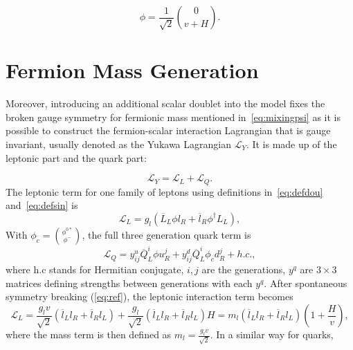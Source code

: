 \begin{equation}
\phi=\frac{1}{\sqrt{2}}\binom{0}{v+H}.
\label{eq:ref}
\end{equation}


\section{Fermion Mass Generation}
\label{mass}
Moreover, introducing an additional scalar doublet into the model fixes the broken gauge symmetry for fermionic mass mentioned in~\autoref{eq:mixingpsi} as it is possible to construct the fermion-scalar interaction Lagrangian that is gauge invariant, usually denoted as the Yukawa Lagrangian $\mathcal{L}_{Y}$. It is made up of the leptonic part and the quark part:

\begin{equation}
	\mathcal{L}_{Y}= \mathcal{L}_{L} + \mathcal{L}_{Q}.
\end{equation}
The leptonic term for one family of leptons using definitions in~\autoref{eq:defdou} and~\autoref{eq:defsin} is
\begin{equation}
	\mathcal{L}_{L}= g_{l}(\overline{L}_{L}\phi l_{R} + \overline{l}_{R} \phi^{\dagger} L_{L}), 
	\label{eq:SSB1}
\end{equation}
With $\phi_{c}=\binom{\phi^{0*}}{\phi^{-}}$, the full three generation quark term is
\begin{equation}
	\mathcal{L}_{Q}= y^{u}_{ij}\overline{Q}^{i}_{L}\phi u^{j}_{R} + {y}^{d}_{ij}\overline{Q}^{i}_{L}\phi_{c} d^{j}_{R} + h.c .,
	\label{eq:SSB2}
\end{equation}
where h.c stands for Hermitian conjugate, $i,j$ are the generations, $y^{q}$ are $3\times3$ matrices defining strengths between generations with each $y^{q}$. After spontaneous symmetry breaking (\autoref{eq:ref}), the leptonic interaction term becomes
\begin{equation}
	\mathcal{L}_{L}= \frac{g_{l}v}{\sqrt{2}}(\overline{l}_{L}l_{R} + \overline{l}_{R}l_{L}) + \frac{g_{l}}{\sqrt{2}}(\overline{l}_{L} l_{R}+\overline{l}_{R} l_{L})H = m_{l}(\overline{l}_{L}l_{R} + \overline{l}_{R}l_{L})(1+\frac{H}{v}),
        \label{eq:SSB3}
\end{equation}
where the mass term is then defined as $m_{l}=\frac{g_{l}v}{\sqrt{2}}$. In a similar way for quarks,


